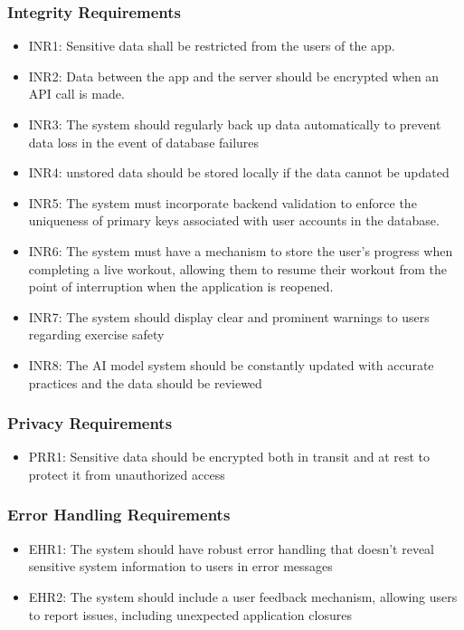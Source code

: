 \documentclass[12pt]{article}
\begin{document}
\subsubsection{Integrity Requirements}
\begin{itemize}
    \item INR1: Sensitive data shall be restricted from the users of the app.
    \item INR2: Data between the app and the server should be encrypted when an API call is made.
    \item INR3: The system should regularly back up data automatically to prevent data loss in the event of database failures
    \item INR4: unstored data should be stored locally if the data cannot be updated
    \item INR5: The system must incorporate backend validation to enforce the uniqueness of primary keys associated with user accounts in the database.
    \item INR6: The system must have a mechanism to store the user's progress when completing a live workout, allowing them to resume their workout from the point of interruption when the application is reopened.
    \item INR7: The system should display clear and prominent warnings to users regarding exercise safety
    \item INR8: The AI model system should be constantly updated with accurate practices and the data should be reviewed
\end{itemize}

\subsubsection{Privacy Requirements}
\begin{itemize}
    \item PRR1: Sensitive data should be encrypted both in transit and at rest to protect it from unauthorized access
\end{itemize}

\subsubsection{Error Handling Requirements}
\begin{itemize}
    \item EHR1: The system should have robust error handling that doesn't reveal sensitive system information to users in error messages
    \item EHR2: The system should include a user feedback mechanism, allowing users to report issues, including unexpected application closures
\end{itemize}
\end{document}
